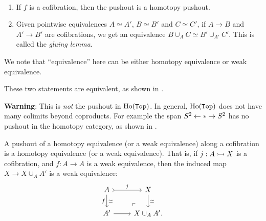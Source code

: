 \documentclass{article}[11pt]
\begin{document}
\begin{exercise}$\ $
\begin{enumerate}
	\item  If $f$ is a cofibration, then the pushout is a homotopy pushout.
	\item Given pointwise equivalences $A\simeq A'$, $B\simeq B'$ and $C\simeq C'$,  if $A\to B$ and $A'\to B'$ are cofibrations, we get an equivalence $B\cup_A C \simeq B'\cup_{A'} C'$. This is called the \textit{gluing lemma}.
\end{enumerate}
We note that ``equivalence'' here can be either homotopy equivalence or weak equivalence.
\end{exercise}

\begin{note} These two statements are equivalent, as shown in \cite{Cary-gluing}.
\end{note}

\textbf{Warning}: This is \textit{not} the pushout in $\text{Ho}(\texttt{Top})$. In general, $\text{Ho}(\texttt{Top})$ does not have many colimits beyond coproducts. For example the span $S^2 \leftarrow \ast \to S^2$ has no pushout in the homotopy category, as shown in \cite{Cary-no-pushout}.


\begin{lemma} A pushout of a homotopy equivalence (or a weak equivalence) along a cofibration is a homotopy equivalence (or a weak equivalence). That is, if $j: A \rightarrowtail X$ is a cofibration, and $f: A\to A$ is a weak equivalence, then the induced map $X \to X\cup_A A'$ is a weak equivalence:
\[
	\begin{tikzcd}
	A\rar[tail,"j"]\dar["f" left, "\simeq" right] & X\dar["\simeq" right] \\
	A'\rar & X\cup_A A'. \po
	\end{tikzcd}
\]
\end{lemma}
\end{document}
